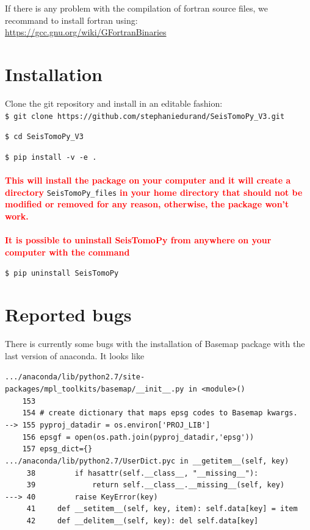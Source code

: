 \documentclass[12pt]{article}
\begin{document}
\noindent If there is any problem with the compilation of fortran source files, we recommand to install fortran using:\\
\url{https://gcc.gnu.org/wiki/GFortranBinaries}

\section{Installation}

Clone the git repository and install in an editable fashion:\\

\verb?$ git clone https://github.com/stephaniedurand/SeisTomoPy_V3.git?

\verb?$ cd SeisTomoPy_V3?

\verb?$ pip install -v -e .?
\\
\\
\noindent   \textcolor{red}{\textbf{This will install the package on your computer and it will create a directory}} \verb?SeisTomoPy_files? \textcolor{red}{\textbf{in your home directory that should not be modified or removed for any reason, otherwise, the package won't work.}} \\
\\
  \textcolor{red}{\textbf{It is possible to uninstall SeisTomoPy from anywhere on your computer with the command}}

\verb?$ pip uninstall SeisTomoPy?

\section{Reported bugs}

There is currently some bugs with the installation of Basemap package with the last version of anaconda.  It looks like

\verb?.../anaconda/lib/python2.7/site-packages/mpl_toolkits/basemap/__init__.py in <module>()?\\
\verb?    153?\\
\verb?    154 # create dictionary that maps epsg codes to Basemap kwargs.?\\
\verb?--> 155 pyproj_datadir = os.environ['PROJ_LIB']?\\
\verb?    156 epsgf = open(os.path.join(pyproj_datadir,'epsg'))?\\
\verb?    157 epsg_dict={}?\\

\verb?.../anaconda/lib/python2.7/UserDict.pyc in __getitem__(self, key)?\\
\verb?     38         if hasattr(self.__class__, "__missing__"):?\\
\verb?     39             return self.__class__.__missing__(self, key)?\\
\verb?---> 40         raise KeyError(key)?\\
\verb?     41     def __setitem__(self, key, item): self.data[key] = item?\\
\verb?     42     def __delitem__(self, key): del self.data[key]?\\
\end{document}
